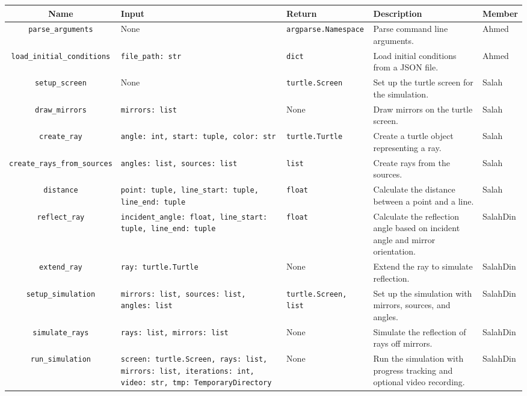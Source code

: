 \documentclass{article}
\begin{document}
\begin{longtable}{c|p{3.3cm}|p{3.3cm}|p{3cm}|p{1.5cm}}
  \bf Name & \bf Input & \bf Return & \bf Description & \bf Member \\
  \hline
  \texttt{parse\_arguments} & None & \texttt{argparse.Namespace} & Parse
  command line arguments. & Ahmed \\
  \hline
  \texttt{load\_initial\_conditions} & \texttt{file\_path: str} & \texttt{dict} & Load initial conditions from a JSON file. & Ahmed \\
  \hline
  \texttt{setup\_screen} & None & \texttt{turtle.Screen} & Set up the turtle
  screen for the simulation. & Salah \\
  \hline
  \texttt{draw\_mirrors} & \texttt{mirrors: list} & None & Draw mirrors on the turtle screen. & Salah \\
  \hline
  \texttt{create\_ray} & \texttt{angle: int, start: tuple, color: str} &
  \texttt{turtle.Turtle} & Create a turtle object representing a ray. &
  Salah \\
  \hline
  \texttt{create\_rays\_from\_sources} & \texttt{angles: list, sources:
  list} & \texttt{list} & Create rays from the sources. & Salah \\
  \hline
  \texttt{distance} & \texttt{point: tuple, line\_start: tuple, line\_end:
  tuple} & \texttt{float} & Calculate the distance between a point and a
  line. & Salah \\
  \hline
  \texttt{reflect\_ray} & \texttt{incident\_angle: float, line\_start:
  tuple, line\_end: tuple} & \texttt{float} & Calculate the reflection angle
  based on incident angle and mirror orientation. & SalahDin \\
  \hline
  \texttt{extend\_ray} & \texttt{ray: turtle.Turtle} & None & Extend the ray
  to simulate reflection. & SalahDin \\
  \hline
  \texttt{setup\_simulation} & \texttt{mirrors: list, sources: list, angles:
  list} & \texttt{turtle.Screen, list} & Set up the simulation with mirrors,
  sources, and angles. & SalahDin \\
  \hline
  \texttt{simulate\_rays} & \texttt{rays: list, mirrors: list} & None &
  Simulate the reflection of rays off mirrors. & SalahDin \\
  \hline
  \texttt{run\_simulation} & \texttt{screen: turtle.Screen, rays: list,
  mirrors: list, iterations: int, video: str, tmp: TemporaryDirectory} &
  None & Run the simulation with progress tracking and optional video
  recording. & SalahDin \\

\end{longtable}
\end{document}
